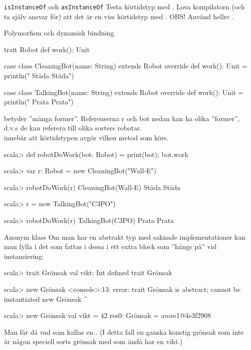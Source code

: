 \begin{Slide}{\texttt{isInstanceOf} och \texttt{asInstanceOf}}\SlideFontTiny
Testa körtidstyp med . Lova kompilatorn (och ta själv ansvar för) att det är en viss körtidstyp med . OBS! Använd hellre .
\end{Slide}



\begin{Slide}{Polymorfism och dynamisk bindning}\SlideFontTiny
\begin{Code}[basicstyle=\SlideFontSize{6.2}{7.5}\ttfamily\selectfont]
trait Robot { def work(): Unit }

case class CleaningBot(name: String) extends Robot {
  override def work(): Unit = println(" Städa Städa")
}

case class TalkingBot(name: String) extends Robot {
  override def work(): Unit = println(" Prata Prata")
}
\end{Code}
 betyder ''många former''. Referenserna r och bot nedan kan ha olika ''former'', d.v.s de kan referera till olika sorters robotar. \\  innebär att körtidstypen avgör vilken metod som körs.
\begin{REPL}[numbers=left, basicstyle=\color{white}\SlideFontSize{6.2}{7.5}\ttfamily\selectfont]
scala> def robotDoWork(bot: Robot) = { print(bot); bot.work }

scala> var r: Robot = new CleaningBot("Wall-E")

scala> robotDoWork(r)
CleaningBot(Wall-E) Städa Städa

scala> r = new TalkingBot("C3PO")

scala> robotDoWork(r)
TalkingBot(C3PO) Prata Prata
\end{REPL}
\end{Slide}


\begin{Slide}{Anonym klass}
Om man har en abstrakt typ med saknade implementationer kan man fylla i det som fattas i dessa i ett extra block som ''hängs på'' vid instansiering:
\begin{REPL}
scala> trait Grönsak { val vikt: Int }
defined trait Grönsak

scala> new Grönsak
<console>:13: error: trait Grönsak is abstract; cannot be instantiated
       new Grönsak
       ^

scala> new Grönsak { val vikt = 42 }
res0: Grönsak = $anon$1@4e3f2908
\end{REPL}
Man får då vad som kallas en . (I detta fall en ganska konstig grönsak som inte är någon speciell sorts grönsak med som ändå har en vikt.)
\end{Slide}


